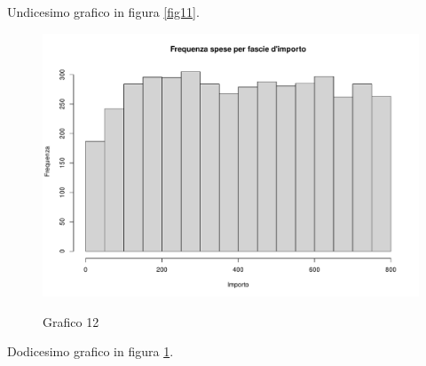 Undicesimo grafico in figura \ref{fig11}.

\clearpage

\begin{figure}[t]
	\caption{Grafico 12}
	\includegraphics[page=12,width=\textwidth]{../R/grafici.pdf}
	\label{fig12}
\end{figure}

Dodicesimo grafico in figura \ref{fig12}.